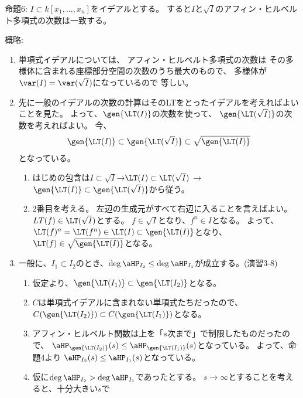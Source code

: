\begin{framed}
  命題6:
  $I\subset k[x_1,\dots,x_n]$をイデアルとする。
  すると$I$と$\sqrt{I}$のアフィン・ヒルベルト多項式の次数は一致する。
\end{framed}
\begin{myproof}
  概略:
  \begin{enumerate}
    \item 単項式イデアルについては、
    アフィン・ヒルベルト多項式の次数は
    その多様体に含まれる座標部分空間の次数のうち最大のもので、
    多様体が$\var(I) = \var(\sqrt{I})$になっているので
    等しい。
    \item
    先に一般のイデアルの次数の計算はそのLTをとったイデアルを考えればよいことを見た。
    よって、$\gen{\LT(I)}$の次数を使って、
    $\gen{\LT(\sqrt{I})}$の次数を考えればよい。
    今、
    \begin{align}
      \gen{\LT(I)} \subset \gen{\LT(\sqrt{I})} \subset \sqrt{\gen{\LT(I)}}
    \end{align}
    となっている。
    \begin{enumerate}
      \item はじめの包含は$I\subset \sqrt{I}$→$\LT(I) \subset \LT(\sqrt{I})$
      →$\gen{\LT(I)} \subset \gen{\LT(\sqrt{I})}$から従う。
      \item
      2番目を考える。
      左辺の生成元がすべて右辺に入ることを言えばよい。
      $LT(f) \in \LT(\sqrt{I})$とする。
      $f\in \sqrt{I}$となり、$f^n \in I$となる。
      よって、$\LT(f)^n = \LT(f^n) \in \LT(I) \subset \gen{\LT(I)}$となり、
      $\LT(f) \in \sqrt{\gen{\LT(I)}}$となる。
    \end{enumerate}
    \item
    一般に、$I_1 \subset I_2$のとき、$
    \deg \aHP_{I_2} \le \deg \aHP_{I_1}$が成立する。(演習3-8)
    \begin{enumerate}
      \item 仮定より、$\gen{\LT(I_1)} \subset \gen{\LT(I_2)}$となる。
      \item $C$は単項式イデアルに含まれない単項式たちだったので、
      $C(\gen{\LT(I_2)}) \subset C(\gen{\LT(I_1)})$となる。
      \item
      アフィン・ヒルベルト関数は上を「$s$次まで」で制限したものだったので、
      $\aHP_{\gen{\LT(I_2)}}(s) \le \aHP_{\gen{\LT(I_1)}}(s)$となっている。
      よって、命題4より
      $\aHP_{I_2}(s) \le \aHP_{I_1}(s)$となっている。
      \item
      仮に$\deg \aHP_{I_2} > \deg \aHP_{I_1}$であったとする。
      $s\to \infty$とすることを考えると、十分大きい$s$で

\end{enumerate}
\end{enumerate}
\end{myproof}
